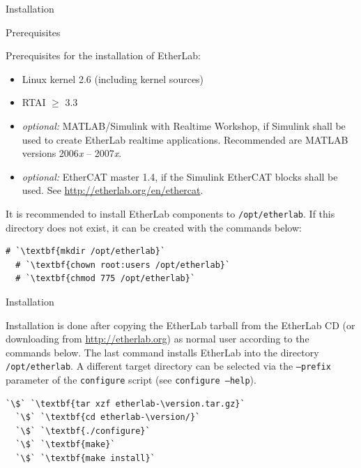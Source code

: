 
\begin{ighsec}{Installation}
\label{sec:install}

\begin{ighsec}{Prerequisites}

Prerequisites for the installation of EtherLab:

\begin{itemize}

\item Linux kernel 2.6 (including kernel sources)

\item RTAI $\ge$ 3.3

\item {\it optional:} MATLAB/Simulink with Realtime Workshop, if Simulink
shall be used to create EtherLab realtime applications. Recommended are MATLAB
versions 2006{\it x} -- 2007{\it x}.

\item {\it optional:} EtherCAT master 1.4, if the Simulink EtherCAT blocks
shall be used. See \url{http://etherlab.org/en/ethercat}.

\end{itemize}

It is recommended to install EtherLab components to \texttt{/opt/etherlab}. If
this directory does not exist, it can be created with the commands below:

\begin{lstlisting}[gobble=2]
  # `\textbf{mkdir /opt/etherlab}`
  # `\textbf{chown root:users /opt/etherlab}`
  # `\textbf{chmod 775 /opt/etherlab}`
\end{lstlisting}

\end{ighsec}

\begin{ighsec}{Installation}
\label{sec:inst-paket}

Installation is done after copying the EtherLab tarball from the EtherLab CD
(or downloading from \url{http://etherlab.org}) as normal user according to
the commands below. The last command installs EtherLab into the directory
\texttt{/opt/etherlab}. A different target directory can be selected via the
\texttt{--prefix} parameter of the \texttt{configure} script (see
\texttt{configure --help}).

\begin{lstlisting}[gobble=2]
  `\$` `\textbf{tar xzf etherlab-\version.tar.gz}`
  `\$` `\textbf{cd etherlab-\version/}`
  `\$` `\textbf{./configure}`
  `\$` `\textbf{make}`
  `\$` `\textbf{make install}`
\end{lstlisting}


\end{ighsec}
\end{ighsec}
